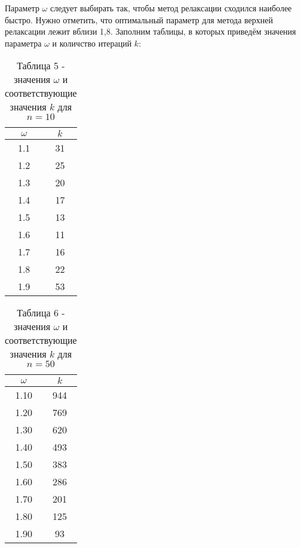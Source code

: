 \documentclass[a4paper,12pt]{article}
\begin{document}
{		Параметр $\omega$ следует выбирать так, чтобы метод релаксации сходился наиболее быстро. 
		Нужно отметить, что оптимальный параметр для метода верхней релаксации лежит вблизи 1,8. 
		Заполним таблицы, в которых приведём значения параметра $\omega$ и количство итераций $k$:
		\begin{table}[h]
			\centering
			\begin{tabular}{|c|c|}
				\hline
				$\omega$ & $k$\\
				\hline
				1.1 & 31\\ \hline
				1.2 & 25\\ \hline
				1.3 & 20\\ \hline
				1.4 & 17\\ \hline
				1.5 & 13\\ \hline
				1.6 & 11\\ \hline
				1.7 & 16\\ \hline
				1.8 & 22\\ \hline
				1.9 & 53\\ \hline
			\end{tabular}
			\caption*{\small{Таблица 5 - значения $\omega$ и соответствующие значения $k$ для $n = 10$}}
		\end{table}
		\clearpage
		\begin{table}[h]
			\centering
			\begin{tabular}{|c|c|}
				\hline
				$\omega$ & $k$\\
				\hline
				1.10 &  944\\ \hline
				1.20 &  769\\ \hline
				1.30 &  620\\ \hline
				1.40 &  493\\ \hline
				1.50 &  383\\ \hline
				1.60 &  286\\ \hline
				1.70 &  201\\ \hline
				1.80 &  125\\ \hline
				1.90 &  93\\ \hline
			\end{tabular}
			\caption*{\small{Таблица 6 - значения $\omega$ и соответствующие значения $k$ для $n = 50$}}
		\end{table}
		
}
\end{document}
